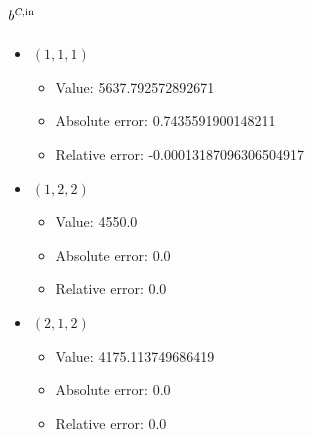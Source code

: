 \documentclass{article}%
\begin{document}
\subsection{$b^{\textsl{C},\text{in}}$}%
\begin{itemize}%
	\item $(1, 1, 1)$%
	\begin{itemize}%
		\item Value: 5637.792572892671%
		\item Absolute error: 0.7435591900148211%
		\item Relative error: -0.00013187096306504917%
	\end{itemize}%
	\item $(1, 2, 2)$%
	\begin{itemize}%
		\item Value: 4550.0%
		\item Absolute error: 0.0%
		\item Relative error: 0.0%
	\end{itemize}%
	\item $(2, 1, 2)$%
	\begin{itemize}%
		\item Value: 4175.113749686419%
		\item Absolute error: 0.0%
		\item Relative error: 0.0%
	\end{itemize}%
\end{itemize}%
\end{document}
